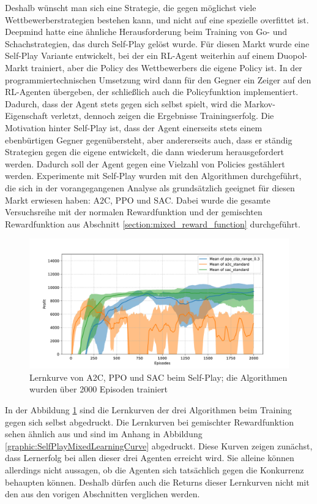 Deshalb wünscht man sich eine Strategie, die gegen möglichst viele Wettbewerberstrategien bestehen kann, und nicht auf eine spezielle overfittet ist.
Deepmind hatte eine ähnliche Herausforderung beim Training von Go- und Schachstrategien, das durch Self-Play gelöst wurde. \cite{Silver2017, https://doi.org/10.48550/arxiv.1712.01815}
Für diesen Markt wurde eine Self-Play Variante entwickelt, bei der ein RL-Agent weiterhin auf einem Duopol-Markt trainiert, aber die Policy des Wettbewerbers die eigene Policy ist.
In der programmiertechnischen Umsetzung wird dann für den Gegner ein Zeiger auf den RL-Agenten übergeben, der schließlich auch die Policyfunktion implementiert.
Dadurch, dass der Agent stets gegen sich selbst spielt, wird die Markov-Eigenschaft verletzt, dennoch zeigen die Ergebnisse Trainingserfolg.
Die Motivation hinter Self-Play ist, dass der Agent einerseits stets einem ebenbürtigen Gegner gegenübersteht, aber andererseits auch, dass er ständig Strategien gegen die eigene entwickelt, die dann wiederum herausgefordert werden.
Dadurch soll der Agent gegen eine Vielzahl von Policies gestählert werden.
Experimente mit Self-Play wurden mit den Algorithmen durchgeführt, die sich in der vorangegangenen Analyse als grundsätzlich geeignet für diesen Markt erwiesen haben: A2C, PPO und SAC.
Dabei wurde die gesamte Versuchsreihe mit der normalen Rewardfunktion und der gemischten Rewardfunktion aus Abschnitt \ref{section:mixed_reward_function} durchgeführt.

\begin{figure}[htbp]
	\centering
	\includegraphics[width=\textwidth]{main/self_play.pdf}
	\caption{Lernkurve von A2C, PPO und SAC beim Self-Play; die Algorithmen wurden über 2000 Episoden trainiert}
	\label{graphic:SelfPlayLearningCurve}
\end{figure}
In der Abbildung \ref{graphic:SelfPlayLearningCurve} sind die Lernkurven der drei Algorithmen beim Training gegen sich selbst abgedruckt.
Die Lernkurven bei gemischter Rewardfunktion sehen ähnlich aus und sind im Anhang in Abbildung \ref{graphic:SelfPlayMixedLearningCurve} abgedruckt.
Diese Kurven zeigen zunächst, dass Lernerfolg bei allen dieser drei Agenten erreicht wird.
Sie alleine können allerdings nicht aussagen, ob die Agenten sich tatsächlich gegen die Konkurrenz behaupten können.
Deshalb dürfen auch die Returns dieser Lernkurven nicht mit den aus den vorigen Abschnitten verglichen werden.

